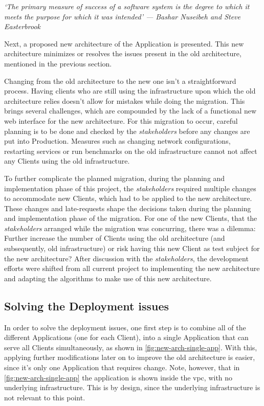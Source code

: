 \begin{displayquote}
\textit{`The primary measure of success of a software system is the degree to which it meets the purpose for which it was intended' --- Bashar Nuseibeh and Steve Easterbrook }
\end{displayquote}

Next, a proposed new architecture of the Application is presented. This new architecture minimizes or resolves the issues present in the old architecture, mentioned in the previous section.

Changing from the old architecture to the new one isn't a straightforward process. Having clients who are still using the infrastructure upon which the old architecture relies doesn't allow for mistakes while doing the migration. This brings several challenges, which are compounded by the lack of a functional new web interface for the new architecture. For this migration to occur, careful planning is to be done and checked by the \textit{stakeholders} before any changes are put into Production. Measures such as changing network configurations, restarting services or run benchmarks on the old infrastructure cannot not affect any Clients using the old infrastructure.

To further complicate the planned migration, during the planning and implementation phase of this project, the \textit{stakeholders} required multiple changes to accommodate new Clients, which had to be applied to the new architecture. These changes and late-requests shape the decisions taken during the planning and implementation phase of the migration. For one of the new Clients, that the \textit{stakeholders} arranged while the migration was concurring, there was a dilemma: Further increase the number of Clients using the old architecture (and subsequently, old infrastructure) or risk having this new Client as test subject for the new architecture? After discussion with the \textit{stakeholders}, the development efforts were shifted from all current project to implementing the new architecture and adapting the algorithms to make use of this new architecture.


\subsection{Solving the Deployment issues}\label{methodology:ss:solving-the-deployment-issues}

In order to solve the deployment issues, one first step is to combine all of the different Applications (one for each Client), into a single Application that can serve all Clients simultaneously, as shown in \cref{fig:new-arch-single-app}. With this, applying further modifications later on to improve the old architecture is easier, since it's only one Application that requires change. Note, however, that in \cref{fig:new-arch-single-app} the application is shown inside the \gls{vpc}, with no underlying infrastructure. This is by design, since the underlying infrastructure is not relevant to this point.

